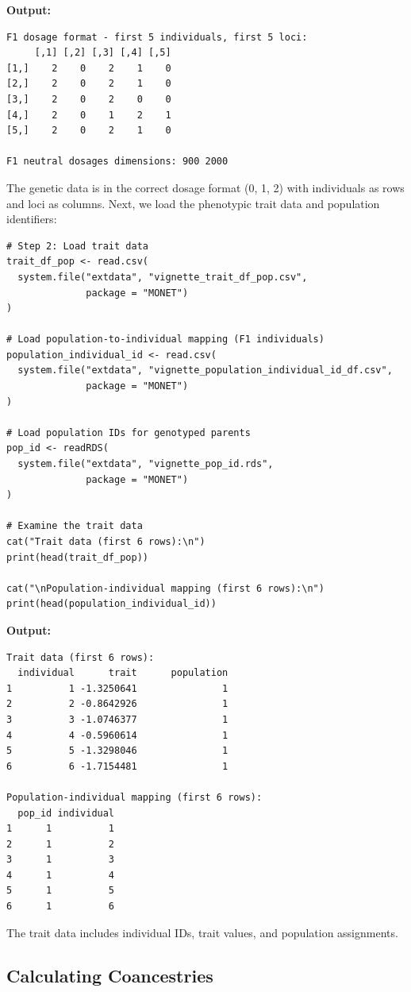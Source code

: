 \documentclass[11pt]{article}
\begin{document}
\textbf{Output:}
\begin{verbatim}
F1 dosage format - first 5 individuals, first 5 loci:
     [,1] [,2] [,3] [,4] [,5]
[1,]    2    0    2    1    0
[2,]    2    0    2    1    0
[3,]    2    0    2    0    0
[4,]    2    0    1    2    1
[5,]    2    0    2    1    0

F1 neutral dosages dimensions: 900 2000
\end{verbatim}

The genetic data is in the correct dosage format (0, 1, 2) with individuals as rows and loci as columns. Next, we load the phenotypic trait data and population identifiers:

\begin{lstlisting}
# Step 2: Load trait data
trait_df_pop <- read.csv(
  system.file("extdata", "vignette_trait_df_pop.csv", 
              package = "MONET")
)

# Load population-to-individual mapping (F1 individuals)
population_individual_id <- read.csv(
  system.file("extdata", "vignette_population_individual_id_df.csv", 
              package = "MONET")
)

# Load population IDs for genotyped parents
pop_id <- readRDS(
  system.file("extdata", "vignette_pop_id.rds", 
              package = "MONET")
)

# Examine the trait data
cat("Trait data (first 6 rows):\n")
print(head(trait_df_pop))

cat("\nPopulation-individual mapping (first 6 rows):\n")
print(head(population_individual_id))
\end{lstlisting}

\textbf{Output:}
\begin{verbatim}
Trait data (first 6 rows):
  individual      trait      population
1          1 -1.3250641               1
2          2 -0.8642926               1
3          3 -1.0746377               1
4          4 -0.5960614               1
5          5 -1.3298046               1
6          6 -1.7154481               1

Population-individual mapping (first 6 rows):
  pop_id individual
1      1          1
2      1          2
3      1          3
4      1          4
5      1          5
6      1          6
\end{verbatim}

The trait data includes individual IDs, trait values, and population assignments.

\subsection{Calculating Coancestries}
\end{document}
